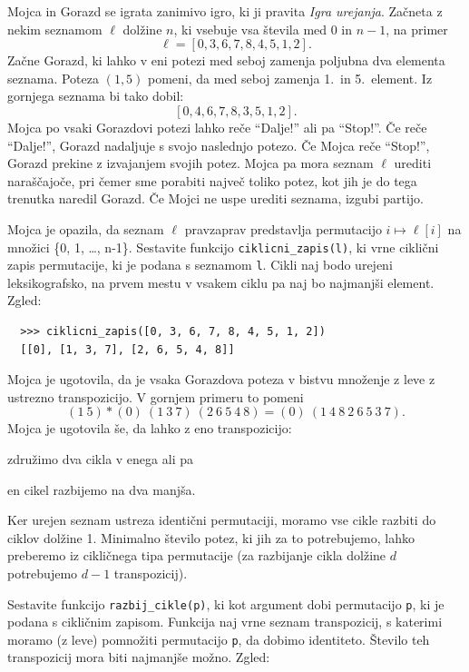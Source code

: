 \documentclass[arhiv]{../izpit}
\begin{document}

Mojca in Gorazd se igrata zanimivo igro, ki ji pravita \emph{Igra urejanja}. Začneta z nekim seznamom $\ell$ dolžine $n$, ki vsebuje vsa števila med 0 in $n-1$, na primer
$$
\ell = [0, 3, 6, 7, 8, 4, 5, 1, 2].
$$
Začne Gorazd, ki lahko v eni potezi  med seboj zamenja poljubna dva elementa seznama. Poteza
$(1, 5)$ pomeni, da med seboj zamenja 1.\ in 5.\ element. Iz gornjega seznama bi tako dobil:
$$
[0, 4, 6, 7, 8, 3, 5, 1, 2].
$$
Mojca po vsaki Gorazdovi potezi lahko reče ``Dalje!'' ali pa ``Stop!''. Če reče ``Dalje!'', Gorazd nadaljuje s svojo naslednjo potezo. Če Mojca reče ``Stop!'', Gorazd prekine z izvajanjem svojih potez. Mojca pa mora seznam $\ell$ urediti naraščajoče, pri čemer sme porabiti največ toliko potez, kot jih je do tega trenutka naredil Gorazd. Če Mojci ne uspe urediti seznama, izgubi partijo.

\podnaloga[10 točk]
Mojca je opazila, da seznam $\ell$ pravzaprav predstavlja permutacijo $i \mapsto \ell[i]$ na množici \{0, 1, \ldots, n-1\}. Sestavite funkcijo \texttt{ciklicni\_zapis(l)}, ki vrne ciklični zapis permutacije, ki je podana s seznamom \texttt{l}. Cikli naj bodo urejeni leksikografsko, na prvem mestu v vsakem ciklu pa naj bo najmanjši element. Zgled:

\begin{verbatim}
  >>> ciklicni_zapis([0, 3, 6, 7, 8, 4, 5, 1, 2])
  [[0], [1, 3, 7], [2, 6, 5, 4, 8]]
\end{verbatim}

\noindent 

\podnaloga[10 točk]
Mojca je ugotovila, da je vsaka Gorazdova poteza v bistvu množenje z leve z ustrezno transpozicijo. V gornjem primeru to pomeni
$$
(1\ 5) * (0)\ (1\ 3\ 7)\ (2\ 6\ 5\ 4\ 8) = (0)\ (1\ 4\ 8\ 2\ 6\ 5\ 3\ 7).
$$
Mojca je ugotovila še, da lahko z eno transpozicijo:
\begin{compactitem}
\item združimo dva cikla v enega ali pa
\item en cikel razbijemo na dva manjša.
\end{compactitem}
Ker urejen seznam ustreza identični permutaciji, moramo vse cikle razbiti do ciklov dolžine 1.
Minimalno število potez, ki jih za to potrebujemo, lahko preberemo iz cikličnega tipa permutacije (za razbijanje cikla dolžine $d$ potrebujemo $d-1$ transpozicij).

Sestavite funkcijo \texttt{razbij\_cikle(p)}, ki kot argument dobi permutacijo \texttt{p}, ki je podana s cikličnim zapisom. Funkcija naj vrne seznam transpozicij, s katerimi moramo (z leve) pomnožiti permutacijo \texttt{p}, da dobimo identiteto. Število teh transpozicij mora biti najmanjše možno. Zgled:
\end{document}
